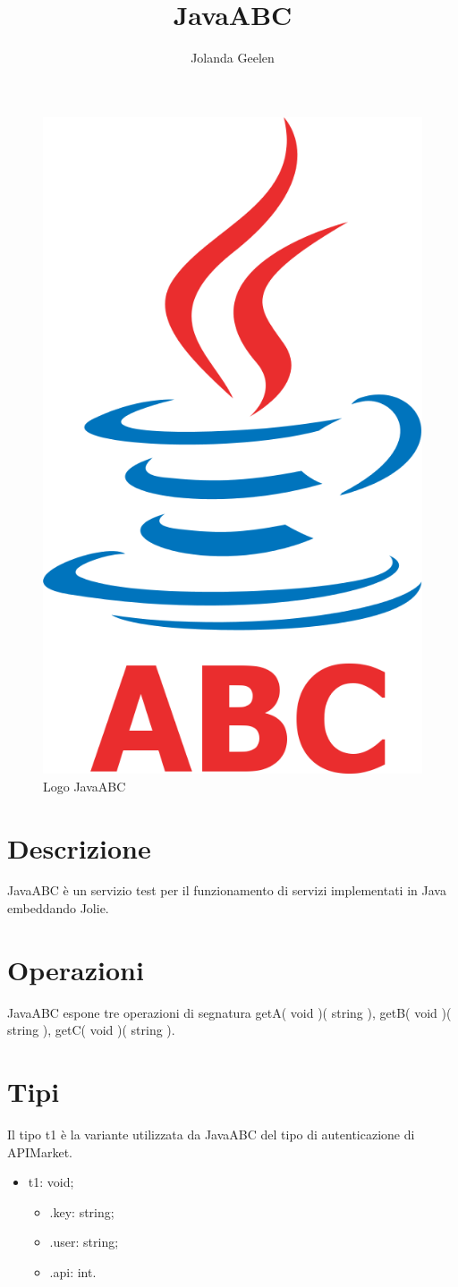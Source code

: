 \documentclass[a4paper]{article}
\title{JavaABC}
\author{Jolanda Geelen}
\begin{document}
\maketitle

\begin{figure}[H]
	\centering
	\includegraphics[width=0.3\linewidth]{JavaABC.png}
	\caption{Logo JavaABC}
\end{figure}

\section{Descrizione}

JavaABC è un servizio test per il funzionamento di servizi implementati in Java embeddando Jolie.

\section{Operazioni}

JavaABC espone tre operazioni di segnatura getA( void )( string ), getB( void )( string ), getC( void )( string ).

\section{Tipi}

Il tipo t1 è la variante utilizzata da JavaABC del tipo di autenticazione di APIMarket.
\begin{itemize}
	\item t1: void;
	\begin{itemize}
		\item .key: string;
		\item .user: string;
		\item .api: int.
	\end{itemize}
\end{itemize}
\end{document}
